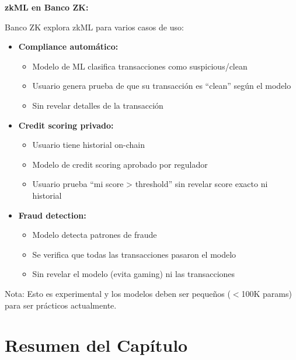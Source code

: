 \documentclass[11pt,a4paper,twoside]{book}
\begin{document}
\begin{bancozk}
\textbf{zkML en Banco ZK:}

Banco ZK explora zkML para varios casos de uso:

\begin{itemize}
    \item \textbf{Compliance autom\'atico:}
    \begin{itemize}
        \item Modelo de ML clasifica transacciones como suspicious/clean
        \item Usuario genera prueba de que su transacci\'on es ``clean'' seg\'un el modelo
        \item Sin revelar detalles de la transacci\'on
    \end{itemize}
    
    \item \textbf{Credit scoring privado:}
    \begin{itemize}
        \item Usuario tiene historial on-chain
        \item Modelo de credit scoring aprobado por regulador
        \item Usuario prueba ``mi score > threshold'' sin revelar score exacto ni historial
    \end{itemize}
    
    \item \textbf{Fraud detection:}
    \begin{itemize}
        \item Modelo detecta patrones de fraude
        \item Se verifica que todas las transacciones pasaron el modelo
        \item Sin revelar el modelo (evita gaming) ni las transacciones
    \end{itemize}
\end{itemize}

Nota: Esto es experimental y los modelos deben ser peque\~nos ($<$100K params) para ser pr\'acticos actualmente.
\end{bancozk}

\section{Resumen del Cap\'itulo}
\label{sec:resumen-cap4}
\end{document}
